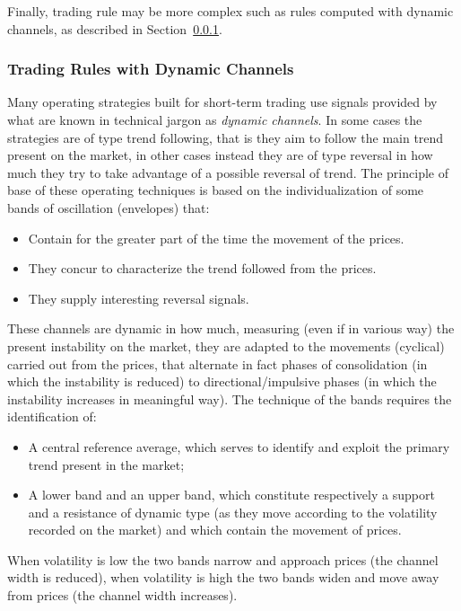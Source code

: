 Finally, trading rule may be more complex such as rules computed with dynamic channels, as described in Section~\ref{sec:dynCha}.


\subsubsection{Trading Rules with Dynamic Channels}
\label{sec:dynCha}
Many operating strategies built for short-term trading use signals provided by what are known in technical jargon as \textit{dynamic channels}. In some cases the strategies are of type trend following, that is they aim to follow the main trend present on the market, in other cases instead they are of type reversal in how much they try to take advantage of a possible reversal of trend.
The principle of base of these operating techniques is based on the individualization of some bands of oscillation (envelopes) that:

\begin{itemize}
\setlength\itemsep{0.3em}
\item Contain for the greater part of the time the movement of the prices.
\item They concur to characterize the trend followed from the prices.
\item They supply interesting reversal signals.
\end{itemize}

These channels are dynamic in how much, measuring (even if in various way) the present instability on the market, they are adapted to the movements (cyclical) carried out from the prices, that alternate in fact phases of consolidation (in which the instability is reduced) to directional/impulsive phases (in which the instability increases in meaningful way). The technique of the bands requires the identification of:

\begin{itemize}
\setlength\itemsep{0.3em}
\item A central reference average, which serves to identify and exploit the primary trend present in the market;
\item A lower band and an upper band, which constitute respectively a support and a resistance of dynamic type (as they move according to the volatility recorded on the market) and which contain the movement of prices.
\end{itemize}

When volatility is low the two bands narrow and approach prices (the channel width is reduced), when volatility is high the two bands widen and move away from prices (the channel width increases). 

